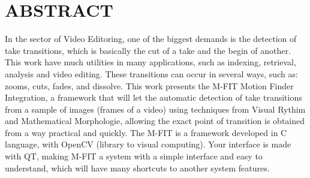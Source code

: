 \chapter*{\centering ABSTRACT \label{abstract}}

\hspace*{1.25cm}In the sector of Video Editoring, one of the biggest
demands is the detection of take transitions, which is basically the
cut of a take and the begin of another. This work have much
utilities in many applications, such as indexing, retrieval,
analysis and video editing. These transitions can occur in several
ways, such as: zooms, cuts, fades, and dissolve. This work presents
the M-FIT Motion Finder Integration, a framework that will let the
automatic detection of take transitions from a sample of images
(frames of a video) using techniques from Visual Rythim and
Mathematical Morphologie, allowing the exact point of transition is
obtained from a way practical and quickly. The M-FIT is a framework
developed in C language, with OpenCV (library to visual computing).
Your interface is made with QT, making M-FIT a system with a simple
interface and easy to understand, which will have many shortcuts to
another system features.
